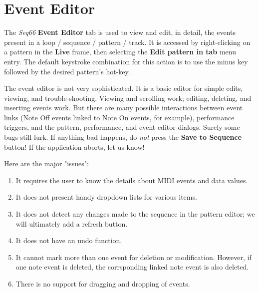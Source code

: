 %
%

\section{Event Editor}
\label{sec:event_editor}

   The \textsl{Seq66} \textbf{Event Editor} tab is used to view and edit,
   in detail, the events present in a loop / sequence / pattern / track.
   It is accessed by right-clicking on a pattern in the \textbf{Live} frame,
   then selecting the \textbf{Edit pattern in tab} menu entry.
   The default keystroke combination for this action is to use the minus key
   followed by the desired pattern's hot-key.

   The event editor is not very sophisticated.
   It is a basic editor for simple edits, viewing, and trouble-shooting.
   Viewing and scrolling work;
   editing, deleting, and inserting events work.
   But there are many possible interactions between event links
   (Note Off events linked to Note On events, for example),
   performance triggers, and the pattern,
   performance, and event editor dialogs.
   Surely some bugs still lurk.
   If anything bad happens, do \textsl{not} press the
   \textbf{Save to Sequence} button!
   If the application aborts, let us know!

   Here are the major "issues":

   \begin{enumerate}
      \item It requires the user to know the details
         about MIDI events and data values.
      \item It does not present handy dropdown lists for various items.
      \item It does not detect any changes made to the sequence in the
         pattern editor; we will ultimately add a refresh button.
      \item It does not have an undo function.
      \item It cannot mark more than one event for deletion or modification.
         However, if one note event is deleted, the corrsponding linked note
         event is also deleted.
      \item There is no support for dragging and dropping of events.
   \end{enumerate}

